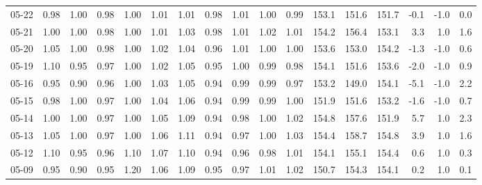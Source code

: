 \begin{threeparttable}
{\begin{tabular}{lrrrrrrrrrrrrrrrr}
  05-22 &   0.98 &   1.00 &         0.98 &     1.00 &           1.01 &        1.01 &        0.98 &        1.01 &          1.00 &          0.99 & 153.1 & 151.6 & 151.7 &       -0.1 &                     -1.0 &                 0.0 \\
  05-21 &   1.00 &   1.00 &         0.98 &     1.00 &           1.01 &        1.03 &        0.98 &        1.01 &          1.02 &          1.01 & 154.2 & 156.4 & 153.1 &        3.3 &                      1.0 &                 1.6 \\
  05-20 &   1.05 &   1.00 &         0.98 &     1.00 &           1.02 &        1.04 &        0.96 &        1.01 &          1.00 &          1.00 & 153.6 & 153.0 & 154.2 &       -1.3 &                     -1.0 &                 0.6 \\
  05-19 &   1.10 &   0.95 &         0.97 &     1.00 &           1.02 &        1.05 &        0.95 &        1.00 &          0.99 &          0.98 & 154.1 & 151.6 & 153.6 &       -2.0 &                     -1.0 &                 0.9 \\
  05-16 &   0.95 &   0.90 &         0.96 &     1.00 &           1.03 &        1.05 &        0.94 &        0.99 &          0.99 &          0.97 & 153.2 & 149.0 & 154.1 &       -5.1 &                     -1.0 &                 2.2 \\
  05-15 &   0.98 &   1.00 &         0.97 &     1.00 &           1.04 &        1.06 &        0.94 &        0.99 &          0.99 &          1.00 & 151.9 & 151.6 & 153.2 &       -1.6 &                     -1.0 &                 0.7 \\
  05-14 &   1.00 &   1.00 &         0.97 &     1.00 &           1.05 &        1.09 &        0.94 &        0.98 &          1.00 &          1.02 & 154.8 & 157.6 & 151.9 &        5.7 &                      1.0 &                 2.3 \\
  05-13 &   1.05 &   1.00 &         0.97 &     1.00 &           1.06 &        1.11 &        0.94 &        0.97 &          1.00 &          1.03 & 154.4 & 158.7 & 154.8 &        3.9 &                      1.0 &                 1.6 \\
  05-12 &   1.10 &   0.95 &         0.96 &     1.10 &           1.07 &        1.10 &        0.94 &        0.96 &          0.98 &          1.01 & 154.1 & 155.1 & 154.4 &        0.6 &                      1.0 &                 0.3 \\
  05-09 &   0.95 &   0.90 &         0.95 &     1.20 &           1.06 &        1.09 &        0.95 &        0.97 &          1.01 &          1.02 & 150.7 & 154.3 & 154.1 &        0.2 &                      1.0 &                 0.1 \\

\end{tabular}}
\end{threeparttable}
